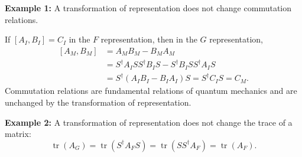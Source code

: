 \textbf{Example 1:} A transformation of representation does not change commutation relations.

If $[A_I,B_I]=C_I$ in the $F$ representation, then in the $G$ representation,
\begin{equation}\begin{aligned}
[A_M,B_M]&=A_MB_M-B_MA_M\\
&=S^\dagger A_I SS^\dagger B_I S-S^\dagger B_I SS^\dagger A_I S\\
&=S^\dagger(A_IB_I-B_IA_I)S=S^\dagger C_I S=C_M.
\end{aligned}\end{equation}
Commutation relations are fundamental relations of quantum mechanics and are unchanged by the transformation of representation.

\textbf{Example 2:} A transformation of representation does not change the trace of a matrix:
\begin{equation}
\operatorname{tr}(A_G)=\operatorname{tr}(S^\dagger A_FS)
=\operatorname{tr}(SS^\dagger A_F)=\operatorname{tr}(A_F).
\end{equation}

